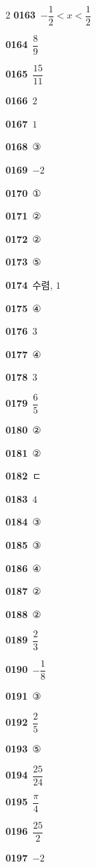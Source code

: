 \documentclass[10pt,a4paper]{article}
\begin{document}
\begin{multicols}{2}
\noindent\textbf{0163}\ $-\dfrac{1}{2}<x<\dfrac{1}{2}$\par
\noindent\textbf{0164}\ $\dfrac{8}{9}$\par
\noindent\textbf{0165}\ $\dfrac{15}{11}$\par
\noindent\textbf{0166}\ $2$\par
\noindent\textbf{0167}\ $1$\par
\noindent\textbf{0168}\ ③\par
\noindent\textbf{0169}\ $-2$\par
\noindent\textbf{0170}\ ①\par
\noindent\textbf{0171}\ ②\par
\noindent\textbf{0172}\ ②\par
\noindent\textbf{0173}\ ⑤\par
\noindent\textbf{0174}\ 수렴, $1$\par
\noindent\textbf{0175}\ ④\par
\noindent\textbf{0176}\ $3$\par
\noindent\textbf{0177}\ ④\par
\noindent\textbf{0178}\ $3$\par
\noindent\textbf{0179}\ $\dfrac{6}{5}$\par
\noindent\textbf{0180}\ ②\par
\noindent\textbf{0181}\ ②\par
\noindent\textbf{0182}\ ㄷ\par
\noindent\textbf{0183}\ $4$\par
\noindent\textbf{0184}\ ③\par
\noindent\textbf{0185}\ ③\par
\noindent\textbf{0186}\ ④\par
\noindent\textbf{0187}\ ②\par
\noindent\textbf{0188}\ ②\par
\noindent\textbf{0189}\ $\dfrac{2}{3}$\par
\noindent\textbf{0190}\ $-\dfrac{1}{8}$\par
\noindent\textbf{0191}\ ③\par
\noindent\textbf{0192}\ $\dfrac{2}{5}$\par
\noindent\textbf{0193}\ ⑤\par
\noindent\textbf{0194}\ $\dfrac{25}{24}$\par
\noindent\textbf{0195}\ $\dfrac{\pi}{4}$\par
\noindent\textbf{0196}\ $\dfrac{25}{2}$\par
\noindent\textbf{0197}\ $-2$\par

\end{multicols}
\end{document}
